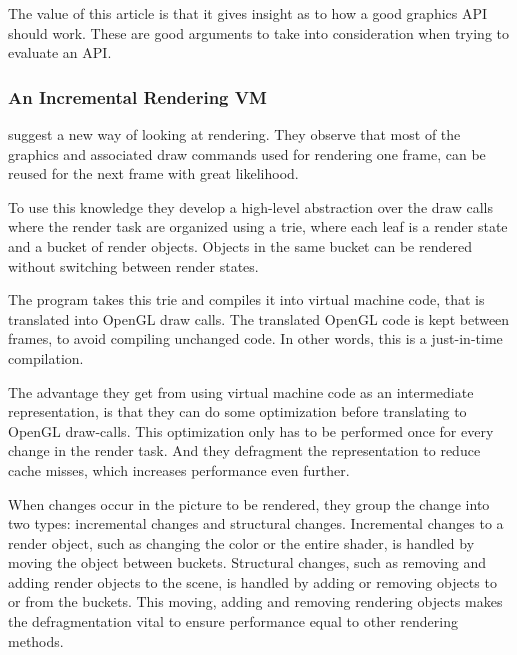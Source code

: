 The value of this article is that it gives insight as to how a good graphics \gls{API} should work.
These are good arguments to take into consideration when trying to evaluate an \gls{API}.

\subsubsection{An Incremental Rendering VM} 

\noindent \citet{haaser_2015_incremental} suggest a new way of looking at rendering. 
They observe that most of the graphics and associated draw commands used for rendering one frame, can be reused for the next frame with great likelihood.

To use this knowledge they develop a high-level abstraction over the draw calls where the render task are organized using a trie, where each leaf is a render state and a bucket of render objects. 
Objects in the same bucket can be rendered without switching between render states.

The program takes this trie and compiles it into virtual machine code, that is translated into OpenGL draw calls.
The translated OpenGL code is kept between frames, to avoid compiling unchanged code.
In other words, this is a just-in-time compilation.

The advantage they get from using virtual machine code as an intermediate representation, is that they can do some optimization before translating to OpenGL draw-calls.
This optimization only has to be performed once for every change in the render task.
And they defragment the representation to reduce cache misses, which increases performance even further. 

When changes occur in the picture to be rendered, they group the change into two types: incremental changes and structural changes.
Incremental changes to a render object, such as changing the color or the entire shader, is handled by moving the object between buckets.
Structural changes, such as removing and adding render objects to the scene, is handled by adding or removing objects to or from the buckets.
This moving, adding and removing rendering objects makes the defragmentation vital to ensure performance equal to other rendering methods.

